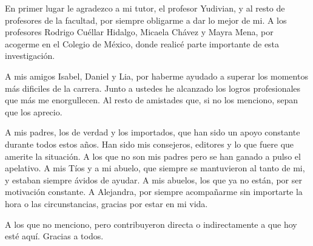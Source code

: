 \begin{acknowledgements}
    En primer lugar le agradezco a mi tutor, el profesor Yudivian, y al resto de profesores de la facultad, por siempre obligarme a dar lo mejor de mi. A los profesores Rodrigo Cuéllar Hidalgo, Micaela Chávez y Mayra Mena, por acogerme en el Colegio de México, donde realicé parte importante de esta investigación.
    
    A mis amigos Isabel, Daniel y Lia, por haberme ayudado a superar los momentos más dificiles de la carrera. Junto a ustedes he alcanzado los logros profesionales que más me enorgullecen. Al resto de amistades que, si no los menciono, sepan que los aprecio.

    A mis padres, los de verdad y los importados, que han sido un apoyo constante durante todos estos años. Han sido mis consejeros, editores y lo que fuere que amerite la situación. A los que no son mis padres pero se han ganado a pulso el apelativo. A mis Tíos y a mi abuelo, que siempre se mantuvieron al tanto de mi, y estaban siempre ávidos de ayudar. A mis abuelos, los que ya no están, por ser motivación constante. A Alejandra, por siempre acompañarme sin importarte la hora o las circunstancias, gracias por estar en mi vida. 

    A los que no menciono, pero contribuyeron directa o indirectamente a que hoy esté aquí. Gracias a todos.
\end{acknowledgements}